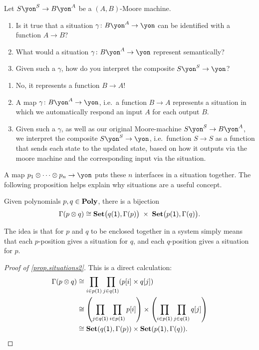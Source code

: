 \documentclass[Book-Poly]{subfiles}
\begin{document}
\begin{exercise}
Let $S\yon^S\to B\yon^A$ be a $(A,B)$-Moore machine.
\begin{enumerate}
	\item Is it true that a situation $\gamma\colon B\yon^A\to\yon$ can be identified with a function $A\to B$?
	\item What would a situation $\gamma\colon B\yon^A\to\yon$ represent semantically?
	\item Given such a $\gamma$, how do you interpret the composite $S\yon^S\to\yon$?
\qedhere
\end{enumerate}
\begin{solution}
\begin{enumerate}
	\item No, it represents a function $B\to A$!
	\item A map $\gamma\colon B\yon^A\to\yon$, i.e.\ a function $B\to A$ represents a situation in which we automatically respond an input $A$ for each output $B$.
	\item Given such a $\gamma$, as well as our original Moore-machine $S\yon^S\to B\yon^A$, we interpret the composite $S\yon^S\to\yon$, i.e.\ function $S\to S$ as a function that sends each state to the updated state, based on how it outputs via the moore machine and the corresponding input via the situation.
\end{enumerate}
\end{solution}
\end{exercise}

A map $p_1\otimes \cdots \otimes p_n\to\yon$ puts these $n$ interfaces in a situation together. The following proposition helps explain why situations are a useful concept.

\begin{proposition}\label{prop.situations2}
Given polynomials $p,q\in\mathbf{Poly}$, there is a bijection
\begin{equation} \label{eqn.situations2}
\Gamma(p\otimes q)\cong\mathbf{Set}\big(q(\textsf{1}),\Gamma(p)\big)\;\times\;\mathbf{Set}\big(p(\textsf{1}),\Gamma(q)\big).
\end{equation}
\end{proposition}
The idea is that for $p$ and $q$ to be enclosed together in a system simply means that each $p$-position gives a situation for $q$, and each $q$-position gives a situation for $p$. 
\begin{proof}[Proof of \cref{prop.situations2}]
This is a direct calculation:
\begin{align*}
	\Gamma(p\otimes q) &\cong
	\prod_{i\in p(\textsf{1})}\prod_{j\in q(\textsf{1})}(p[i]\times q[j]) \\
	&\cong
	\left(\prod_{j\in q(\textsf{1})}\prod_{i\in p(\textsf{1})}p[i]\right)\times
		 \left(\prod_{i\in p(\textsf{1})}\prod_{j\in q(\textsf{1})}q[j]\right) \\
	&\cong
	\mathbf{Set}(q(\textsf{1}),\Gamma(p))\times\mathbf{Set}(p(\textsf{1}),\Gamma(q)).
\end{align*}
\end{proof}
\end{document}
